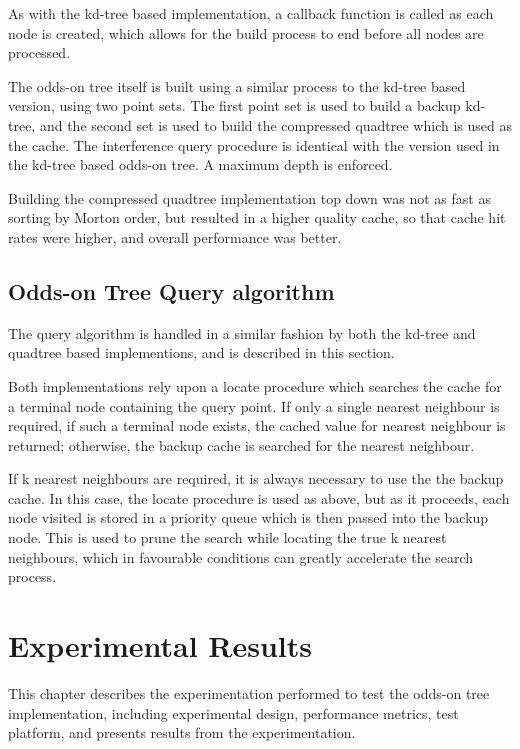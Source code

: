 \documentclass[mcs]{scsthesis}
\begin{document}
As with the kd-tree based implementation, a callback function is called as
each node is created, which allows for the build process to end before all
nodes are processed.

The odds-on tree itself is built using a similar process to the kd-tree based
version, using two point sets. The first point set is used to build a backup
kd-tree, and the second set is used to build the compressed quadtree which
is used as the cache. The interference query procedure is identical with the
version used in the kd-tree based odds-on tree. A maximum depth is enforced.

Building the compressed quadtree implementation top down was not as fast as
sorting by Morton order, but resulted in a higher quality cache, so that cache
hit rates were higher, and overall performance was better.


\section{Odds-on Tree Query algorithm}

The query algorithm is handled in a similar fashion by both the kd-tree and
quadtree based implementions, and is described in this section.

Both implementations rely upon a locate procedure which searches the cache for a
terminal node containing the query point. If only a single nearest neighbour
is required, if such a terminal node exists, the cached value for nearest
neighbour is returned; otherwise, the backup cache is searched for the
nearest neighbour.

If k nearest neighbours are required, it is always necessary to use the the
backup cache. In this case, the locate procedure is used as above, but as it
proceeds, each node visited is stored in a priority queue which is then passed
into the backup node. This is used to prune the search while locating the true
k nearest neighbours, which in favourable conditions can greatly accelerate
the search process.

\chapter{Experimental Results}

This chapter describes the experimentation performed to test the odds-on tree
implementation, including experimental design, performance metrics, test
platform, and presents results from the experimentation.
\end{document}
